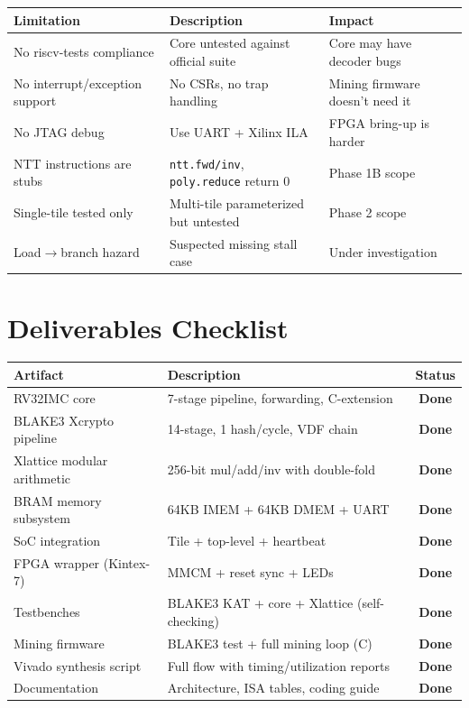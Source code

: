 \documentclass[11pt,a4paper]{article}
\begin{document}
\begin{center}
\begin{tabular}{@{}lp{7cm}l@{}}
\toprule
\textbf{Limitation} & \textbf{Description} & \textbf{Impact} \\
\midrule
No riscv-tests compliance & Core untested against official suite & Core may have decoder bugs \\
No interrupt/exception support & No CSRs, no trap handling & Mining firmware doesn't need it \\
No JTAG debug & Use UART + Xilinx ILA & FPGA bring-up is harder \\
NTT instructions are stubs & \texttt{ntt.fwd/inv}, \texttt{poly.reduce} return 0 & Phase 1B scope \\
Single-tile tested only & Multi-tile parameterized but untested & Phase 2 scope \\
Load$\to$branch hazard & Suspected missing stall case & Under investigation \\
\bottomrule
\end{tabular}
\end{center}

\section{Deliverables Checklist}

\begin{center}
\begin{tabular}{@{}lp{7cm}c@{}}
\toprule
\textbf{Artifact} & \textbf{Description} & \textbf{Status} \\
\midrule
RV32IMC core & 7-stage pipeline, forwarding, C-extension & \textcolor{qnkgreen}{\textbf{Done}} \\
BLAKE3 Xcrypto pipeline & 14-stage, 1 hash/cycle, VDF chain & \textcolor{qnkgreen}{\textbf{Done}} \\
Xlattice modular arithmetic & 256-bit mul/add/inv with double-fold & \textcolor{qnkgreen}{\textbf{Done}} \\
BRAM memory subsystem & 64KB IMEM + 64KB DMEM + UART & \textcolor{qnkgreen}{\textbf{Done}} \\
SoC integration & Tile + top-level + heartbeat & \textcolor{qnkgreen}{\textbf{Done}} \\
FPGA wrapper (Kintex-7) & MMCM + reset sync + LEDs & \textcolor{qnkgreen}{\textbf{Done}} \\
Testbenches & BLAKE3 KAT + core + Xlattice (self-checking) & \textcolor{qnkgreen}{\textbf{Done}} \\
Mining firmware & BLAKE3 test + full mining loop (C) & \textcolor{qnkgreen}{\textbf{Done}} \\
Vivado synthesis script & Full flow with timing/utilization reports & \textcolor{qnkgreen}{\textbf{Done}} \\
Documentation & Architecture, ISA tables, coding guide & \textcolor{qnkgreen}{\textbf{Done}} \\
\bottomrule
\end{tabular}
\end{center}
\end{document}

